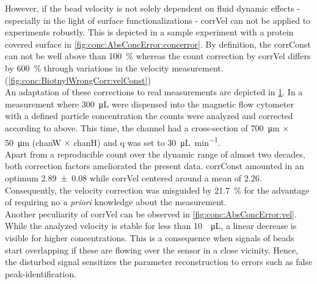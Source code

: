 \begin{figure}[h!]
	\centering
	 \hfill
	\addtocounter{subfigure}{-1}
	\label{fig:conc:AbsConcError}
\end{figure}
However, if the bead velocity is not solely dependent on fluid dynamic effects - especially in the light of surface functionalizations - \gls{corrVel} can not be applied to experiments robustly. This is depicted in a sample experiment with a protein covered surface in \cref{fig:conc:AbsConcError:concerror}. By definition, the \gls{corrConst} can not be well above than \SI{100}{\percent} whereas the count correction by \gls{corrVel} differs by \SI{600}{\percent} through variations in the velocity measurement.(\cref{fig:conc:BiotnylWrongCorr:velConst}) \\
An adaptation of these corrections to real measurements are depicted in \cref{fig:conc:AbsConcError}. In a measurement where \SI{300}{\micro\liter} were dispensed into the magnetic flow cytometer with a defined particle concentration the counts were analyzed and corrected according to above. This time, the channel had a cross-section of \SI{700}{\micro\meter} $\times$ \SI{50}{\micro\meter} (\gls{chanW} $\times$ \gls{chanH}) and \gls{q} was set to \SI{30}{\micro\liter\per\minute}.\\
Apart from a reproducible count over the dynamic range of almost two decades, both correction factors ameliorated the present data. \gls{corrConst} amounted in an optimum \num{2,89 +- 0,08} while \gls{corrVel} centered around a mean of \num{2,26}. Consequently, the velocity correction was misguided by \SI{21.7}{\percent} for the advantage of requiring no \textit{a priori} knowledge about the measurement.\\
Another peculiarity of \gls{corrVel} can be observed in \cref{fig:conc:AbsConcError:vel}. While the analyzed velocity is stable for less than \SI{10}{\per\micro\liter}, a linear decrease is visible for higher concentrations. This is a consequence when signals of beads start overlapping if these are flowing over the sensor in a close vicinity. Hence, the disturbed signal sensitizes the parameter reconstruction to errors such as false peak-identification.
